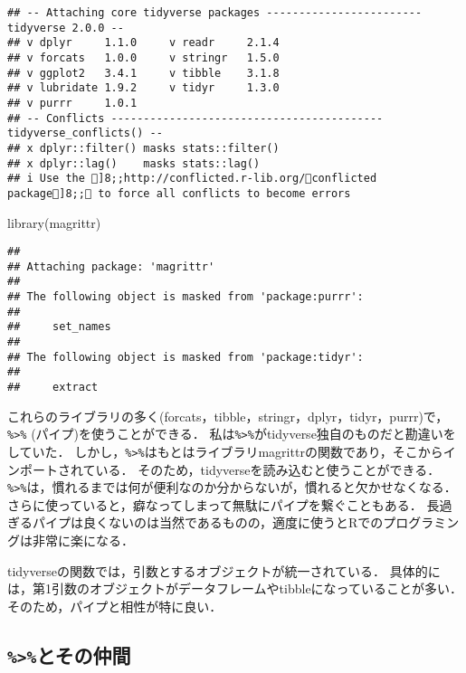 \documentclass[
]{article}
\newenvironment{Shaded}{\begin{snugshade}}{\end{snugshade}}
\newcommand{\FunctionTok}[1]{\textcolor[rgb]{0.00,0.00,0.00}{#1}}
\newcommand{\NormalTok}[1]{#1}
\begin{document}
\begin{verbatim}
## -- Attaching core tidyverse packages ------------------------ tidyverse 2.0.0 --
## v dplyr     1.1.0     v readr     2.1.4
## v forcats   1.0.0     v stringr   1.5.0
## v ggplot2   3.4.1     v tibble    3.1.8
## v lubridate 1.9.2     v tidyr     1.3.0
## v purrr     1.0.1     
## -- Conflicts ------------------------------------------ tidyverse_conflicts() --
## x dplyr::filter() masks stats::filter()
## x dplyr::lag()    masks stats::lag()
## i Use the ]8;;http://conflicted.r-lib.org/conflicted package]8;; to force all conflicts to become errors
\end{verbatim}

\begin{Shaded}
\begin{Highlighting}[]
\FunctionTok{library}\NormalTok{(magrittr)}
\end{Highlighting}
\end{Shaded}

\begin{verbatim}
## 
## Attaching package: 'magrittr'
## 
## The following object is masked from 'package:purrr':
## 
##     set_names
## 
## The following object is masked from 'package:tidyr':
## 
##     extract
\end{verbatim}

これらのライブラリの多く(forcats，tibble，stringr，dplyr，tidyr，purrr)で，\texttt{\%\textgreater{}\%} (パイプ)を使うことができる．
私は\texttt{\%\textgreater{}\%}がtidyverse独自のものだと勘違いをしていた．
しかし，\texttt{\%\textgreater{}\%}はもとはライブラリmagrittrの関数であり，そこからインポートされている．
そのため，tidyverseを読み込むと使うことができる．
\texttt{\%\textgreater{}\%}は，慣れるまでは何が便利なのか分からないが，慣れると欠かせなくなる．
さらに使っていると，癖なってしまって無駄にパイプを繋ぐこともある．
長過ぎるパイプは良くないのは当然であるものの，適度に使うとRでのプログラミングは非常に楽になる．

tidyverseの関数では，引数とするオブジェクトが統一されている．
具体的には，第1引数のオブジェクトがデータフレームやtibbleになっていることが多い．
そのため，パイプと相性が特に良い．

\hypertarget{ux3068ux305dux306eux4ef2ux9593}{%
\subsection{\texorpdfstring{\texttt{\%\textgreater{}\%}とその仲間}{\%\textgreater\%とその仲間}}\label{ux3068ux305dux306eux4ef2ux9593}}
\end{document}
